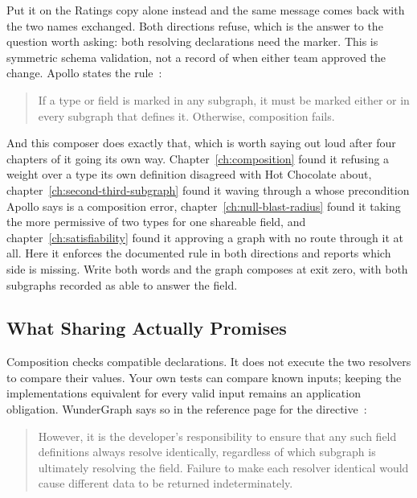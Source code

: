 %
Put it on the Ratings copy alone instead and the same message comes back with
the two names exchanged. Both directions refuse, which is the answer to the
question worth asking: both resolving declarations need the marker. This is
symmetric schema validation, not a record of when either team approved the
change. Apollo states the rule~\autocite{apollovaluetypes}:

\begin{quote}
If a type or field is marked  in any subgraph, it must be
marked either  or  in every subgraph that
defines it. Otherwise, composition fails.
\end{quote}

%
And this composer does exactly that, which is worth saying out loud after four
chapters of it going its own way. Chapter~\ref{ch:composition} found it
refusing a  weight over a type its own definition disagreed with
Hot Chocolate about, chapter~\ref{ch:second-third-subgraph} found it waving
through a  whose precondition Apollo says is a composition
error, chapter~\ref{ch:null-blast-radius} found it taking the more permissive
of two types for one shareable field, and chapter~\ref{ch:satisfiability}
found it approving a graph with no route through it at all. Here it enforces
the documented rule in both directions and reports which side is missing. Write
both words and the graph composes at exit zero, with both subgraphs recorded
as able to answer the field.

\subsection{What Sharing Actually Promises}

%
Composition checks compatible declarations. It does not execute the two
resolvers to compare their values. Your own tests can compare known inputs;
keeping the implementations equivalent for every valid input remains an
application obligation. WunderGraph
says so in the reference page for the directive~\autocite{cosmoshareable}:

\begin{quote}
However, it is the developer's responsibility to ensure that any such field
definitions always resolve identically, regardless of which subgraph is
ultimately resolving the field. Failure to make each resolver identical would
cause different data to be returned indeterminately.
\end{quote}

